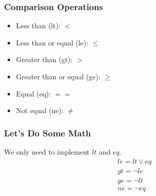 \begin{frame}
    \frametitle{Comparison Operations}
    \begin{itemize}
        \item Less than (lt): $<$
        \item Less than or equal (le): $\leq$
        \item Greater than (gt): $>$
        \item Greater than or equal (ge): $\geq$
        \item Equal (eq): $==$
        \item Not equal (ne): $\neq$
    \end{itemize}
    \note{
    }
\end{frame}

\begin{frame}
    \frametitle{Let's Do Some Math}
    We only need to implement $lt$ and $eq$.
    \begin{equation}
        \begin{aligned}
            & le = lt \lor eq \\
            & gt = \neg le \\
            & ge = \neg lt \\
            & ne = \neg eq
        \end{aligned}
    \end{equation}
    \note{
    }
\end{frame}
